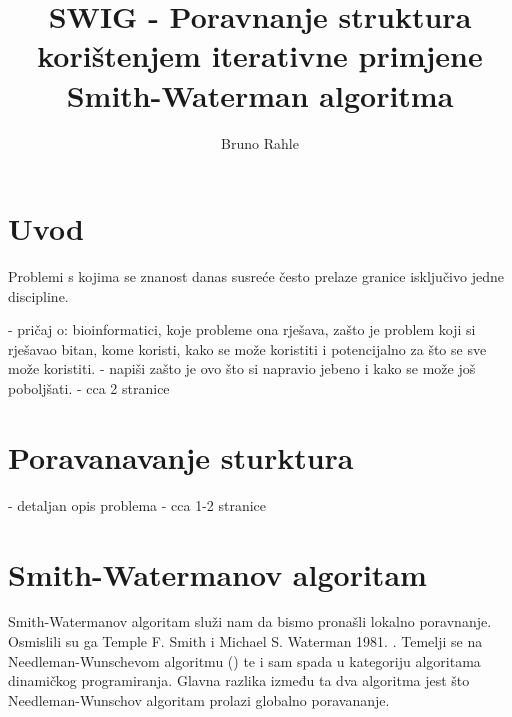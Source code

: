 \documentclass[times, utf8, zavrsni]{fer}
\begin{document}

\title{SWIG - Poravnanje struktura korištenjem iterativne primjene Smith-Waterman algoritma}

\author{Bruno Rahle}

\maketitle

\izvornik

\zahvala{}

\tableofcontents

\listoffigures

\listoftables

\chapter{Uvod}
Problemi s kojima se znanost danas susreće često prelaze granice isključivo
jedne discipline. 

- pričaj o: bioinformatici, koje probleme ona rješava, zašto je problem koji si rješavao bitan,
kome koristi, kako se može koristiti i potencijalno za što se sve može koristiti.
- napiši zašto je ovo što si napravio jebeno i kako se može još poboljšati.
- cca 2 stranice

\chapter{Poravanavanje sturktura}
- detaljan opis problema
- cca 1-2 stranice

\chapter{Smith-Watermanov algoritam}
Smith-Watermanov algoritam služi nam da bismo pronašli lokalno poravnanje. 
Osmislili su ga Temple F. Smith i Michael S. Waterman 1981. \cite{smithwaterman1981}.
Temelji se na Needleman-Wunschevom algoritmu (\cite{needlemanwunsch1970})
te i sam spada u kategoriju algoritama dinamičkog programiranja. Glavna razlika
između ta dva algoritma jest što Needleman-Wunschov algoritam prolazi globalno
poravananje.
\end{document}
